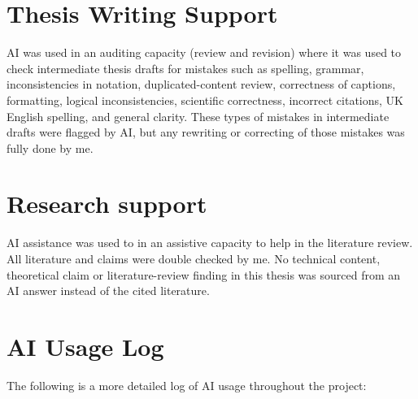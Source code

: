 \documentclass[11pt,a4paper,oneside]{report}
\begin{document}
\section*{Thesis Writing Support}


AI was used in an auditing capacity (review and revision) where it was used to check intermediate thesis drafts for mistakes such as spelling, grammar, inconsistencies in notation, duplicated-content review, correctness of captions, formatting, logical inconsistencies, scientific correctness, incorrect citations, UK English spelling, and general clarity. These types of mistakes in intermediate drafts were flagged by AI, but any rewriting or correcting of those mistakes was fully done by me.


\section*{Research support}

AI assistance was used to in an assistive capacity to help in the literature review. All literature and claims were double checked by me. No technical content,
theoretical claim or literature-review finding in this thesis was sourced from an AI answer instead of the cited literature.

\section*{AI Usage Log}

The following is a more detailed log of AI usage throughout the project:
\end{document}
